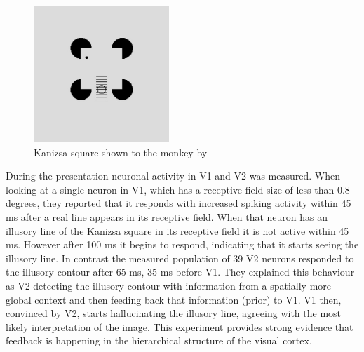 \begin{figure}
  \includegraphics[width=\linewidth]{figures/kanizsaSquare.PNG}
  \caption{Kanizsa square shown to the monkey by \citet{HierachicalBayesVisualCortex}}
  \label{fig:KanizsaSquare}
\end{figure}
During the presentation neuronal activity in V1 and V2 was measured. When looking at a single neuron in V1, which has a receptive field size of less than 0.8 degrees, they reported that it responds with increased spiking activity within 45 ms after a real line appears in its receptive field. When that neuron has an illusory line of the Kanizsa square in its receptive field it is not active within 45 ms. However after 100 ms it begins to respond, indicating that it starts seeing the illusory line. In contrast the measured population of 39 V2 neurons responded to the illusory contour after 65 ms, 35 ms before V1. They explained this behaviour as V2 detecting the illusory contour with information from a spatially more global context and then feeding back that information (prior) to V1. V1 then, convinced by V2, starts hallucinating the illusory line, agreeing with the most likely interpretation of the image. This experiment provides strong evidence that feedback is happening in the hierarchical structure of the visual cortex.
 






